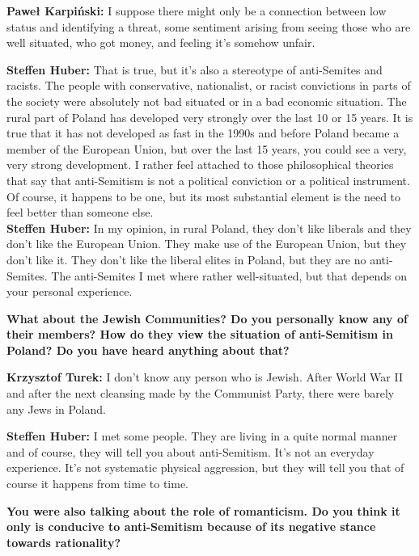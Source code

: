 \textbf{Paweł Karpiński:} I suppose there might only be a connection between low status and identifying a threat, some sentiment arising from seeing those who are well situated, who got money, and feeling it's somehow unfair. \par  
\textbf{Steffen Huber:} That is true, but it's also a stereotype of anti-Semites and racists. The people with conservative, nationalist, or racist convictions in parts of the society were absolutely not bad situated or in a bad economic situation. The rural part of Poland has developed very strongly over the last 10 or 15 years. It is true that it has not developed as fast in the 1990s and before Poland became a member of the European Union, but over the last 15 years, you could see a very, very strong development. I rather feel attached to those philosophical theories that say that anti-Semitism is not a political conviction or a political instrument. Of course, it happens to be one, but its most substantial element is the need to feel better than someone else.\\ 
\textbf{Steffen Huber:} In my opinion, in rural Poland, they don't like liberals and they don't like the European Union. They make use of the European Union, but they don't like it. They don't like the liberal elites in Poland, but they are no anti-Semites. The anti-Semites I met where rather well-situated, but that depends on your personal experience.

\textbf{What about the Jewish Communities? Do you personally know any of their members? How do they view the situation of anti-Semitism in Poland? Do you have heard anything about that?}  

\textbf{Krzysztof Turek:} I don’t know any person who is Jewish. After World War II and after the next cleansing made by the Communist Party, there were barely any Jews in Poland. \par
\textbf{Steffen Huber:} I met some people. They are living in a quite normal manner and of course, they will tell you about anti-Semitism. It’s not an everyday experience. It's not systematic physical aggression, but they will tell you that of course it happens from time to time. 

\textbf{You were also talking about the role of romanticism. Do you think it only is conducive to anti-Semitism because of its negative stance towards rationality?} 

